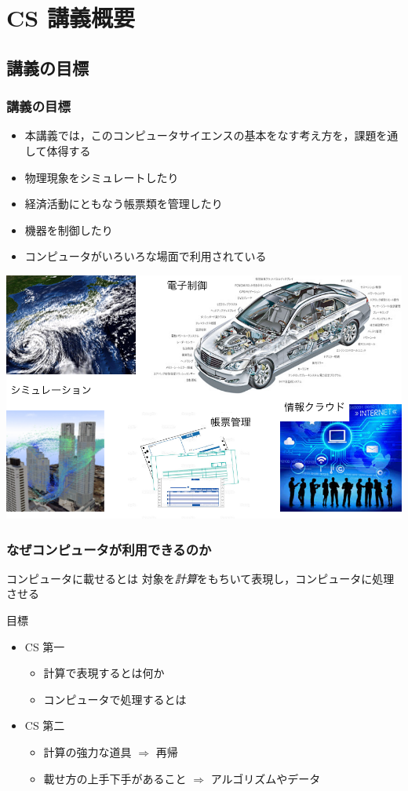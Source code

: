 \section{CS 講義概要}
%
%
\subsection{講義の目標}
\begin{frame}
\frametitle{講義の目標}
  \begin{itemize}
\item 本講義では，このコンピュータサイエンスの基本をなす考え方を，課題を通して体得する
\item 物理現象をシミュレートしたり
\item 経済活動にともなう帳票類を管理したり
\item 機器を制御したり
\item コンピュータがいろいろな場面で利用されている
  \end{itemize}
\centering
\includegraphics[scale=.35]{./Figure/elementaryCS-1st-FigComputer.pdf}
\end{frame}
\begin{frame}
\frametitle{なぜコンピュータが利用できるのか}
  \begin{block}{コンピュータに載せるとは}
対象を\emph{計算}をもちいて表現し，コンピュータに処理させる
  \end{block}
  \begin{block}{目標}
    \begin{itemize}
\item CS 第一
      \begin{itemize}
\item 計算で表現するとは何か
\item コンピュータで処理するとは
      \end{itemize}
\item CS 第二 \href{https://wakita.github.io/classes/years/y23/cs2/course.html}{}
      \begin{itemize}
\item 計算の強力な道具 $\Rightarrow$ 再帰
\item 載せ方の上手下手があること $\Rightarrow$ アルゴリズムやデータ
      \end{itemize}
    \end{itemize}
  \end{block}
\end{frame}
